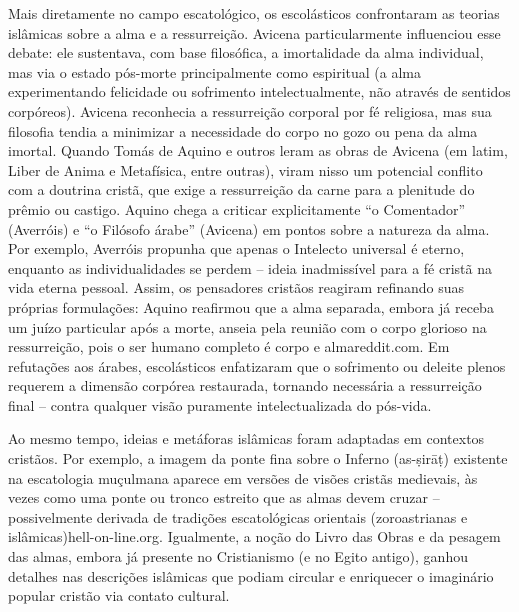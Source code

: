 Mais diretamente no campo escatológico, os escolásticos confrontaram as teorias islâmicas sobre a alma e a ressurreição. Avicena particularmente influenciou esse debate: ele sustentava, com base filosófica, a imortalidade da alma individual, mas via o estado pós-morte principalmente como espiritual (a alma experimentando felicidade ou sofrimento intelectualmente, não através de sentidos corpóreos). Avicena reconhecia a ressurreição corporal por fé religiosa, mas sua filosofia tendia a minimizar a necessidade do corpo no gozo ou pena da alma imortal. Quando Tomás de Aquino e outros leram as obras de Avicena (em latim, Liber de Anima e Metafísica, entre outras), viram nisso um potencial conflito com a doutrina cristã, que exige a ressurreição da carne para a plenitude do prêmio ou castigo. Aquino chega a criticar explicitamente “o Comentador” (Averróis) e “o Filósofo árabe” (Avicena) em pontos sobre a natureza da alma. Por exemplo, Averróis propunha que apenas o Intelecto universal é eterno, enquanto as individualidades se perdem -- ideia inadmissível para a fé cristã na vida eterna pessoal. Assim, os pensadores cristãos reagiram refinando suas próprias formulações: Aquino reafirmou que a alma separada, embora já receba um juízo particular após a morte, anseia pela reunião com o corpo glorioso na ressurreição, pois o ser humano completo é corpo e almareddit.com. Em refutações aos árabes, escolásticos enfatizaram que o sofrimento ou deleite plenos requerem a dimensão corpórea restaurada, tornando necessária a ressurreição final -- contra qualquer visão puramente intelectualizada do pós-vida.

Ao mesmo tempo, ideias e metáforas islâmicas foram adaptadas em contextos cristãos. Por exemplo, a imagem da ponte fina sobre o Inferno (as-\d{s}irā\d{t}) existente na escatologia muçulmana aparece em versões de visões cristãs medievais, às vezes como uma ponte ou tronco estreito que as almas devem cruzar -- possivelmente derivada de tradições escatológicas orientais (zoroastrianas e islâmicas)hell-on-line.org. Igualmente, a noção do Livro das Obras e da pesagem das almas, embora já presente no Cristianismo (e no Egito antigo), ganhou detalhes nas descrições islâmicas que podiam circular e enriquecer o imaginário popular cristão via contato cultural.

